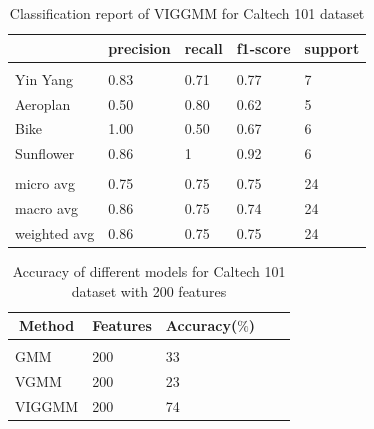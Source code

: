 \documentclass[letterpaper]{article}
\begin{document}
\begin{table}
    \caption{Classification report of VIGGMM for Caltech 101 dataset}
    \label{classificationo report caltech 101}
    \centering
    \resizebox{\columnwidth}{!}
    {%
    \begin{tabular}{lllll}
        \multicolumn{1}{c}{\bf }  &\multicolumn{1}{c}{\bf precision}&\multicolumn{1}{c}{\bf recall}&\multicolumn{1}{c}{\bf f1-score} &\multicolumn{1}{c}{\bf support}   \\
        \hline \\
        Yin Yang         &0.83 &0.71&0.77&7 \\
        Aeroplan             &0.50  &0.80&0.62&5\\
        Bike             &1.00  &0.50&0.67&6\\
        Sunflower             &0.86  &1&0.92&6\\\\
        micro avg             &0.75  &0.75&0.75&24\\
        macro avg             &0.86  &0.75&0.74&24\\
        weighted avg             &0.86  &0.75&0.75&24\\
        \end{tabular}
    }
\end{table}

\begin{table}[h]
    \caption{Accuracy of different models for Caltech 101 dataset with 200 features}
    \label{features 200 Caltech}
    \begin{center}
    \begin{tabular}{lllll}
    \multicolumn{1}{c}{\bf Method}  &\multicolumn{1}{c}{\bf Features} &\multicolumn{1}{c}{\bf Accuracy($\%$)}   \\
    \hline \\
    GMM         &200 &33 \\
    VGMM             &200  &23\\
    VIGGMM             &200  &74\\
    \end{tabular}
    \end{center}
\end{table}
\end{document}
